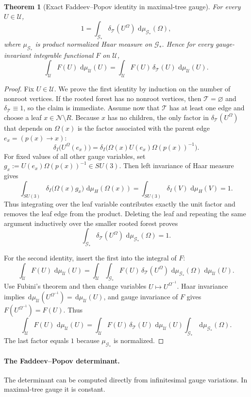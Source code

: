 \documentclass[11pt]{article}
\newtheorem{theorem}{Theorem}[section]
\theoremstyle{remark}
\newcommand{\mcN}{\mathcal N}
\newcommand{\mcT}{\mathcal T}
\newcommand{\mcG}{\mathcal G}
\newcommand{\mcU}{\mathscr U}
\newcommand{\dd}{\,\mathrm d}
\begin{document}
\begin{theorem}[Exact Faddeev--Popov identity in maximal-tree gauge]
\label{thm:fp-identity}
For every $U\in\mcU$,
\[
1=\int_{\mcG_*}\delta_{\mcT}(U^\Omega)\,\dd\mu_{\mcG_*}(\Omega),
\]
where $\mu_{\mcG_*}$ is product normalized Haar measure on $\mcG_*$.  Hence for
every gauge-invariant integrable functional $F$ on $\mcU$,
\[
\int_{\mcU}F(U)\,\dd\mu_{\mcU}(U)
=
\int_{\mcU}F(U)\,\delta_{\mcT}(U)\,\dd\mu_{\mcU}(U).
\]
\end{theorem}
\begin{proof}
Fix $U\in\mcU$.  We prove the first identity by induction on the number of
nonroot vertices.
If the rooted forest has no nonroot vertices, then $\mcT=\varnothing$ and
$\delta_{\mcT}\equiv 1$, so the claim is immediate.
Assume now that $\mcT$ has at least one edge and choose a leaf
$x\in\mcN\setminus R$.
Because $x$ has no children, the only factor in $\delta_{\mcT}(U^\Omega)$ that
depends on $\Omega(x)$ is the factor associated with the parent edge
$e_x=(p(x)\to x)$:
\[
\delta_I\!\bigl(U^\Omega(e_x)\bigr)
=
\delta_I\!\bigl(\Omega(x)U(e_x)\Omega(p(x))^{-1}\bigr).
\]
For fixed values of all other gauge variables, set
$g_x:=U(e_x)\Omega(p(x))^{-1}\in SU(3)$.  Then left invariance of Haar measure
gives
\[
\int_{SU(3)}\delta_I\!\bigl(\Omega(x)g_x\bigr)\,\dd\mu_H(\Omega(x))
=
\int_{SU(3)}\delta_I(V)\,\dd\mu_H(V)=1.
\]
Thus integrating over the leaf variable contributes exactly the unit factor and
removes the leaf edge from the product.
Deleting the leaf and repeating the same argument inductively over the smaller
rooted forest proves
\[
\int_{\mcG_*}\delta_{\mcT}(U^\Omega)\,\dd\mu_{\mcG_*}(\Omega)=1.
\]

For the second identity, insert the first into the integral of $F$:
\[
\int_{\mcU}F(U)\,\dd\mu_{\mcU}(U)
=
\int_{\mcU}\int_{\mcG_*}
F(U)\,\delta_{\mcT}(U^\Omega)\,\dd\mu_{\mcG_*}(\Omega)\,\dd\mu_{\mcU}(U).
\]
Use Fubini's theorem and then change variables $U\mapsto U^{\Omega^{-1}}$.
Haar invariance implies $\dd\mu_{\mcU}(U^{\Omega^{-1}})=\dd\mu_{\mcU}(U)$, and
gauge invariance of $F$ gives $F(U^{\Omega^{-1}})=F(U)$.  Thus
\[
\int_{\mcU}F(U)\,\dd\mu_{\mcU}(U)
=
\int_{\mcU}F(U)\,\delta_{\mcT}(U)\,\dd\mu_{\mcU}(U)
\int_{\mcG_*}\dd\mu_{\mcG_*}(\Omega).
\]
The last factor equals $1$ because $\mu_{\mcG_*}$ is normalized.
\end{proof}

\paragraph{The Faddeev--Popov determinant.}
The determinant can be computed directly from infinitesimal gauge variations.
In maximal-tree gauge it is constant.
\end{document}
